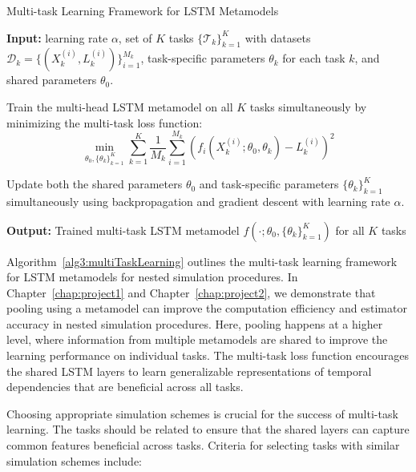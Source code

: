 \begin{algorithm}
    \caption{Multi-task Learning Framework for LSTM Metamodels}
    \begin{algorithmic}[1] \label{alg3:multiTaskLearning}
        \STATE \textbf{Input:} learning rate $\alpha$, set of $K$ tasks $\{\mathcal{T}_k\}_{k=1}^K$ with datasets $\mathcal{D}_k = \{(X_k^{(i)}, L_k^{(i)})\}_{i=1}^{M_k}$, task-specific parameters $\theta_k$ for each task $k$, and shared parameters $\theta_0$.
    
        \STATE Train the multi-head LSTM metamodel on all $K$ tasks simultaneously by minimizing the multi-task loss function:
        \begin{equation} \label{eq3:multiTaskLoss}
            \min_{\theta_0, \{\theta_k\}_{k=1}^K} \sum_{k=1}^K \frac{1}{M_k} \sum_{i=1}^{M_k} \left( f_i(X_k^{(i)}; \theta_0, \theta_k) - L_k^{(i)} \right)^2
        \end{equation}
    
        \STATE Update both the shared parameters $\theta_0$ and task-specific parameters $\{\theta_k\}_{k=1}^K$ simultaneously using backpropagation and gradient descent with learning rate $\alpha$.
        
        \STATE \textbf{Output:} Trained multi-task LSTM metamodel $f(\cdot; \theta_0, \{\theta_k\}_{k=1}^K)$ for all $K$ tasks
    \end{algorithmic}
\end{algorithm}

Algorithm~\ref{alg3:multiTaskLearning} outlines the multi-task learning framework for LSTM metamodels for nested simulation procedures.
In Chapter~\ref{chap:project1} and Chapter~\ref{chap:project2}, we demonstrate that pooling using a metamodel can improve the computation efficiency and estimator accuracy in nested simulation procedures.
Here, pooling happens at a higher level, where information from multiple metamodels are shared to improve the learning performance on individual tasks.
The multi-task loss function encourages the shared LSTM layers to learn generalizable representations of temporal dependencies that are beneficial across all tasks.

Choosing appropriate simulation schemes is crucial for the success of multi-task learning. 
The tasks should be related to ensure that the shared layers can capture common features beneficial across tasks. 
Criteria for selecting tasks with similar simulation schemes include:

